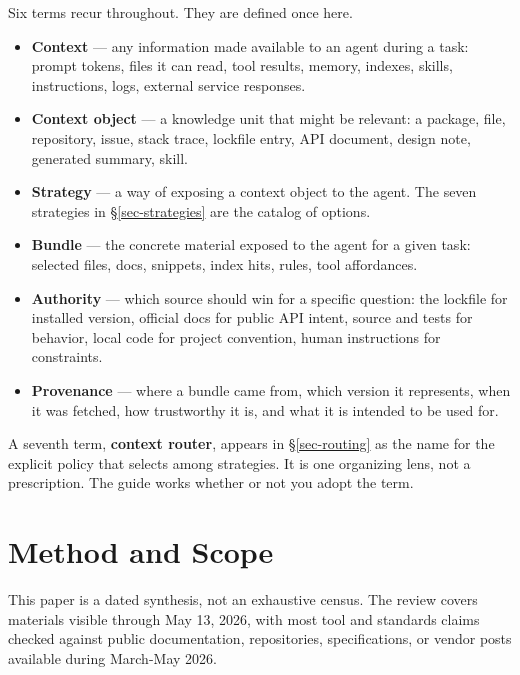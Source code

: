 \documentclass[
  11pt,
  letterpaper,
  numbers=noendperiod,
  parskip=half]{scrartcl}
\begin{document}
Six terms recur throughout. They are defined once here.

\begin{itemize}
\item
  \textbf{Context} --- any information made available to an agent during
  a task: prompt tokens, files it can read, tool results, memory,
  indexes, skills, instructions, logs, external service responses.
\item
  \textbf{Context object} --- a knowledge unit that might be relevant: a
  package, file, repository, issue, stack trace, lockfile entry, API
  document, design note, generated summary, skill.
\item
  \textbf{Strategy} --- a way of exposing a context object to the agent.
  The seven strategies in \S\ref{sec-strategies} are the catalog of
  options.
\item
  \textbf{Bundle} --- the concrete material exposed to the agent for a
  given task: selected files, docs, snippets, index hits, rules, tool
  affordances.
\item
  \textbf{Authority} --- which source should win for a specific
  question: the lockfile for installed version, official docs for public
  API intent, source and tests for behavior, local code for project
  convention, human instructions for constraints.
\item
  \textbf{Provenance} --- where a bundle came from, which version it
  represents, when it was fetched, how trustworthy it is, and what it
  is intended to be used for.
\end{itemize}

A seventh term, \textbf{context router}, appears in \S\ref{sec-routing}
as the name for the explicit policy that selects among strategies. It
is one organizing lens, not a prescription. The guide works whether or
not you adopt the term.

\iffalse
\section{Method and Scope}\label{sec-method}

This paper is a dated synthesis, not an exhaustive census. The review
covers materials visible through May 13, 2026, with most tool and
standards claims checked against public documentation, repositories,
specifications, or vendor posts available during March-May 2026.
\end{document}
